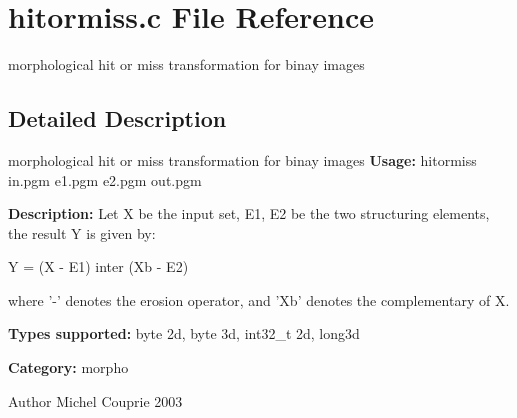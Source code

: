 \section{hitormiss.c File Reference}
\label{hitormiss_8c}


morphological hit or miss transformation for binay images  




\subsection{Detailed Description}
morphological hit or miss transformation for binay images {\bfseries Usage:} hitormiss in.pgm e1.pgm e2.pgm out.pgm

{\bfseries Description:} Let X be the input set, E1, E2 be the two structuring elements, the result Y is given by:\par
 Y = (X -\/ E1) inter (Xb -\/ E2)\par
 where '-\/' denotes the erosion operator, and 'Xb' denotes the complementary of X.

{\bfseries Types supported:} byte 2d, byte 3d, int32\_\-t 2d, long3d

{\bfseries Category:} morpho

\begin{DoxyAuthor}{Author}
Michel Couprie 2003 
\end{DoxyAuthor}
